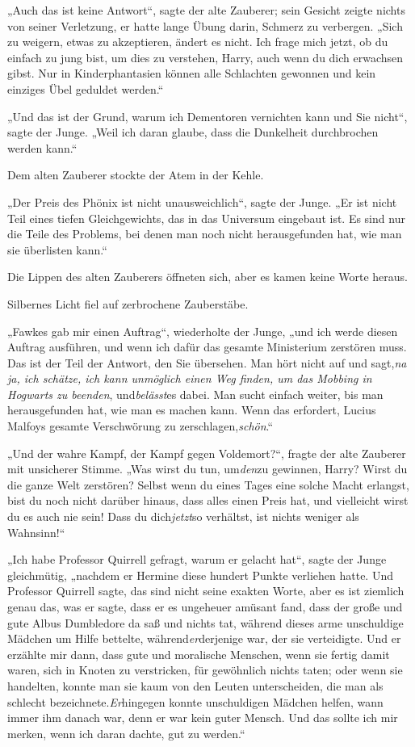 {„Auch das ist keine Antwort“, sagte der alte Zauberer; sein Gesicht zeigte nichts von seiner Verletzung, er hatte lange Übung darin, Schmerz zu verbergen. „Sich zu weigern, etwas zu akzeptieren, ändert es nicht. Ich frage mich jetzt, ob du einfach zu jung bist, um dies zu verstehen, Harry, auch wenn du dich erwachsen gibst. Nur in Kinderphantasien können alle Schlachten gewonnen und kein einziges Übel geduldet werden.“

„Und das ist der Grund, warum ich Dementoren vernichten kann und Sie nicht“, sagte der Junge. „Weil ich daran glaube, dass die Dunkelheit durchbrochen werden kann.“

Dem alten Zauberer stockte der Atem in der Kehle.

„Der Preis des Phönix ist nicht unausweichlich“, sagte der Junge. „Er ist nicht Teil eines tiefen Gleichgewichts, das in das Universum eingebaut ist. Es sind nur die Teile des Problems, bei denen man noch nicht herausgefunden hat, wie man sie überlisten kann.“

Die Lippen des alten Zauberers öffneten sich, aber es kamen keine Worte heraus.

Silbernes Licht fiel auf zerbrochene Zauberstäbe.

„Fawkes gab mir einen Auftrag“, wiederholte der Junge, „und ich werde diesen Auftrag ausführen, und wenn ich dafür das gesamte Ministerium zerstören muss. Das ist der Teil der Antwort, den Sie übersehen. Man hört nicht auf und sagt,\emph{na ja, ich schätze, ich kann unmöglich einen Weg finden, um das Mobbing in Hogwarts zu beenden}, und\emph{belässt}es dabei. Man sucht einfach weiter, bis man herausgefunden hat, wie man es machen kann. Wenn das erfordert, Lucius Malfoys gesamte Verschwörung zu zerschlagen,\emph{schön}.“

„Und der wahre Kampf, der Kampf gegen Voldemort?“, fragte der alte Zauberer mit unsicherer Stimme. „Was wirst du tun, um\emph{den}zu gewinnen, Harry? Wirst du die ganze Welt zerstören? Selbst wenn du eines Tages eine solche Macht erlangst, bist du noch nicht darüber hinaus, dass alles einen Preis hat, und vielleicht wirst du es auch nie sein! Dass du dich\emph{jetzt}so verhältst, ist nichts weniger als Wahnsinn!“

„Ich habe Professor Quirrell gefragt, warum er gelacht hat“, sagte der Junge gleichmütig, „nachdem er Hermine diese hundert Punkte verliehen hatte. Und Professor Quirrell sagte, das sind nicht seine exakten Worte, aber es ist ziemlich genau das, was er sagte, dass er es ungeheuer amüsant fand, dass der große und gute Albus Dumbledore da saß und nichts tat, während dieses arme unschuldige Mädchen um Hilfe bettelte, während\emph{er}derjenige war, der sie verteidigte. Und er erzählte mir dann, dass gute und moralische Menschen, wenn sie fertig damit waren, sich in Knoten zu verstricken, für gewöhnlich nichts taten; oder wenn sie handelten, konnte man sie kaum von den Leuten unterscheiden, die man als schlecht bezeichnete.\emph{Er}hingegen konnte unschuldigen Mädchen helfen, wann immer ihm danach war, denn er war kein guter Mensch. Und das sollte ich mir merken, wenn ich daran dachte, gut zu werden.“

}
